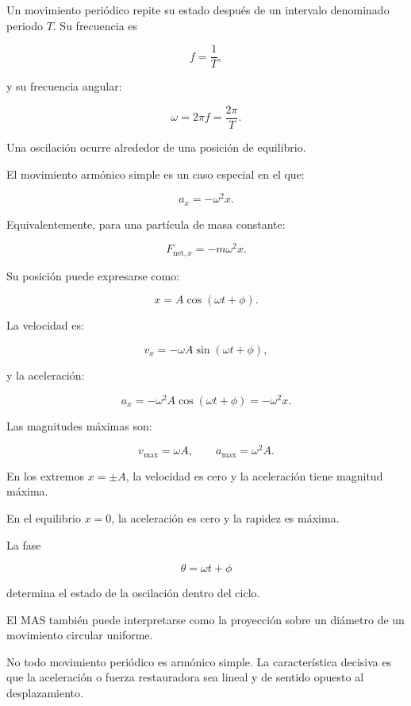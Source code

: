 \begin{resumen}
Un movimiento periódico repite su estado después de un intervalo denominado periodo \(T\). Su frecuencia es

\[ f=\frac{1}{T}, \]

y su frecuencia angular:

\[ \omega=2\pi f=\frac{2\pi}{T}. \]

Una oscilación ocurre alrededor de una posición de equilibrio.

El movimiento armónico simple es un caso especial en el que:

\[ \boxed{a_x=-\omega^2x}. \]

Equivalentemente, para una partícula de masa constante:

\[ \boxed{F_{\text{net},x}=-m\omega^2x}. \]

Su posición puede expresarse como:

\[ \boxed{x=A\cos(\omega t+\phi)}. \]

La velocidad es:

\[ \boxed{v_x=-\omega A\sin(\omega t+\phi)}, \]

y la aceleración:

\[ \boxed{a_x=-\omega^2A\cos(\omega t+\phi)=-\omega^2x}. \]

Las magnitudes máximas son:

\[ v_{\max}=\omega A,\qquad a_{\max}=\omega^2A. \]

En los extremos \(x=\pm A\), la velocidad es cero y la aceleración tiene magnitud máxima.

En el equilibrio \(x=0\), la aceleración es cero y la rapidez es máxima.

La fase

\[ \theta=\omega t+\phi \]

determina el estado de la oscilación dentro del ciclo.

El MAS también puede interpretarse como la proyección sobre un diámetro de un movimiento circular uniforme.

No todo movimiento periódico es armónico simple. La característica decisiva es que la aceleración o fuerza restauradora sea lineal y de sentido opuesto al desplazamiento.
\end{resumen}